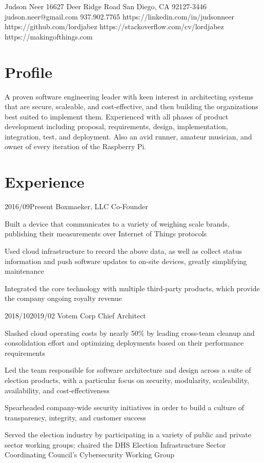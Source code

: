 \documentclass{article}
\begin{document}
\header
  {Judson Neer}
  {16627 Deer Ridge Road}
  {San Diego, CA 92127-3446}
  {judson.neer@gmail.com}
  {937.902.7765}
  {https://linkedin.com/in/judsonneer}
  {https://github.com/lordjabez}
  {https://stackoverflow.com/cv/lordjabez}
  {https://makingofthings.com}


\section{Profile}

A proven software engineering leader with keen interest in architecting systems that are secure, scaleable, and cost-effective, and then building the organizations best suited to implement them. Experienced with all phases of product development including proposal, requirements, design, implementation, integration, test, and deployment. Also an avid runner, amateur musician, and owner of every iteration of the Raspberry Pi.


\section{Experience}

\job
  {2016/09}{Present}
  {Boxmaeker, LLC}
  {Co-Founder}
  {\begin{achievements}
    \item Built a device that communicates to a variety of weighing scale brands, publishing their measurements over Internet of Things protocols
    \item Used cloud infrastructure to record the above data, as well as collect status information and push software updates to on-site devices, greatly simplifying maintenance
    \item Integrated the core technology with multiple third-party products, which provide the company ongoing royalty revenue
  \end{achievements}}

\job
  {2018/10}{2019/02}
  {Votem Corp}
  {Chief Architect}
  {\begin{achievements}
    \item Slashed cloud operating costs by nearly 50\% by leading cross-team cleanup and consolidation effort and optimizing deployments based on their performance requirements
    \item Led the team responsible for software architecture and design across a suite of election products, with a particular focus on security, modularity, scaleability, availability, and cost-effectiveness
    \item Spearheaded company-wide security initiatives in order to build a culture of transparency, integrity, and customer success
    \item Served the election industry by participating in a variety of public and private sector working groups; chaired the DHS Election Infrastructure Sector Coordinating Council's Cybersecurity Working Group
  \end{achievements}}
\end{document}
